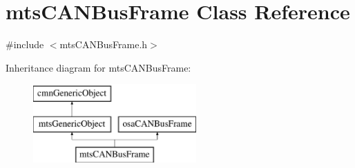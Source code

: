 \hypertarget{classmts_c_a_n_bus_frame}{\section{mts\-C\-A\-N\-Bus\-Frame Class Reference}
\label{classmts_c_a_n_bus_frame}
}


{\ttfamily \#include $<$mts\-C\-A\-N\-Bus\-Frame.\-h$>$}

Inheritance diagram for mts\-C\-A\-N\-Bus\-Frame\-:\begin{figure}[H]
\begin{center}
\leavevmode
\includegraphics[height=3.000000cm]{df/da2/classmts_c_a_n_bus_frame}
\end{center}
\end{figure}
